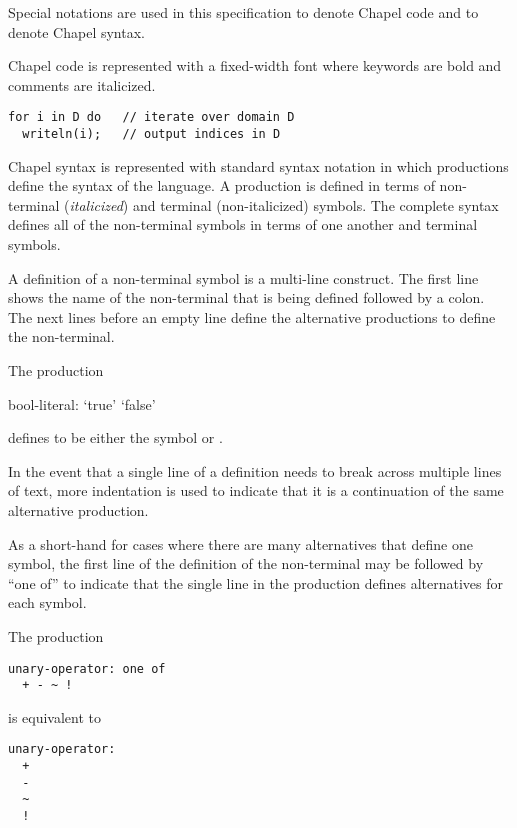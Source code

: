 \label{Notation}

Special notations are used in this specification to denote Chapel code
and to denote Chapel syntax.

Chapel code is represented with a fixed-width font where keywords are
bold and comments are italicized.
\begin{example}
\begin{chapel}
\begin{verbatim}
for i in D do   // iterate over domain D
  writeln(i);   // output indices in D
\end{verbatim}
\end{chapel}
\end{example}

Chapel syntax is represented with standard syntax notation in which
productions define the syntax of the language.  A production is
defined in terms of non-terminal ({\it italicized}) and terminal
(non-italicized) symbols.  The complete syntax defines all of the
non-terminal symbols in terms of one another and terminal symbols.

A definition of a non-terminal symbol is a multi-line construct.  The
first line shows the name of the non-terminal that is being defined
followed by a colon.  The next lines before an empty line define the
alternative productions to define the non-terminal.
\begin{example}
The production
\begin{syntaxdonotcollect}
bool-literal:
  `true'
  `false'
\end{syntaxdonotcollect}
defines  to be either the symbol  or
.
\end{example}
In the event that a single line of a definition needs to break across
multiple lines of text, more indentation is used to indicate that it
is a continuation of the same alternative production.

As a short-hand for cases where there are many alternatives that
define one symbol, the first line of the definition of the
non-terminal may be followed by ``one of'' to indicate that the single
line in the production defines alternatives for each symbol.
\begin{example}
The production
\begin{syntaxdonotcollect}
\begin{verbatim}
unary-operator: one of
  + - ~ !
\end{verbatim}
\end{syntaxdonotcollect}
is equivalent to
\begin{syntaxdonotcollect}
\begin{verbatim}
unary-operator:
  +
  -
  ~
  !
\end{verbatim}
\end{syntaxdonotcollect}
\end{example}

